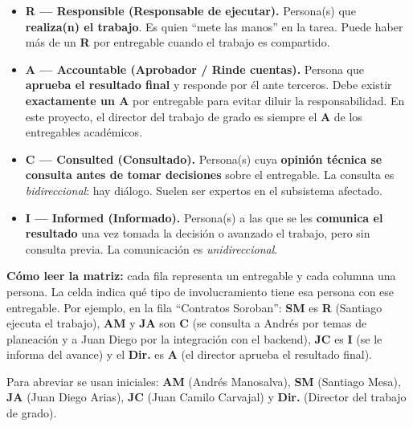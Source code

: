 \documentclass[12pt,oneside]{report}
\begin{document}
      \begin{itemize}
        \item \textbf{R --- Responsible (Responsable de ejecutar).} Persona(s) que \textbf{realiza(n) el trabajo}. Es quien ``mete las manos'' en la tarea. Puede haber más de un \textbf{R} por entregable cuando el trabajo es compartido.
        \item \textbf{A --- Accountable (Aprobador / Rinde cuentas).} Persona que \textbf{aprueba el resultado final} y responde por él ante terceros. Debe existir \textbf{exactamente un A} por entregable para evitar diluir la responsabilidad. En este proyecto, el director del trabajo de grado es siempre el \textbf{A} de los entregables académicos.
        \item \textbf{C --- Consulted (Consultado).} Persona(s) cuya \textbf{opinión técnica se consulta antes de tomar decisiones} sobre el entregable. La consulta es \textit{bidireccional}: hay diálogo. Suelen ser expertos en el subsistema afectado.
        \item \textbf{I --- Informed (Informado).} Persona(s) a las que se les \textbf{comunica el resultado} una vez tomada la decisión o avanzado el trabajo, pero sin consulta previa. La comunicación es \textit{unidireccional}.
      \end{itemize}

      \textbf{Cómo leer la matriz:} cada fila representa un entregable y cada columna una persona. La celda indica qué tipo de involucramiento tiene esa persona con ese entregable. Por ejemplo, en la fila ``Contratos Soroban'': \textbf{SM} es \textbf{R} (Santiago ejecuta el trabajo), \textbf{AM} y \textbf{JA} son \textbf{C} (se consulta a Andrés por temas de planeación y a Juan Diego por la integración con el backend), \textbf{JC} es \textbf{I} (se le informa del avance) y el \textbf{Dir.} es \textbf{A} (el director aprueba el resultado final).

      Para abreviar se usan iniciales: \textbf{AM} (Andrés Manosalva), \textbf{SM} (Santiago Mesa), \textbf{JA} (Juan Diego Arias), \textbf{JC} (Juan Camilo Carvajal) y \textbf{Dir.} (Director del trabajo de grado).
\end{document}
